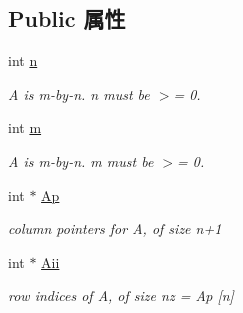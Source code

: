 \subsection*{Public 属性}
\begin{DoxyCompactItemize}
\item 
\hypertarget{classg2o_1_1MatrixStructure_aa91f296406c17ab3a826d03bf75cfea7}{int \hyperlink{classg2o_1_1MatrixStructure_aa91f296406c17ab3a826d03bf75cfea7}{n}}\label{classg2o_1_1MatrixStructure_aa91f296406c17ab3a826d03bf75cfea7}

\begin{DoxyCompactList}\small\item\em A is m-\/by-\/n. n must be $>$= 0. \end{DoxyCompactList}\item 
\hypertarget{classg2o_1_1MatrixStructure_a9cceed2097dcbaa27ed88b7005440616}{int \hyperlink{classg2o_1_1MatrixStructure_a9cceed2097dcbaa27ed88b7005440616}{m}}\label{classg2o_1_1MatrixStructure_a9cceed2097dcbaa27ed88b7005440616}

\begin{DoxyCompactList}\small\item\em A is m-\/by-\/n. m must be $>$= 0. \end{DoxyCompactList}\item 
\hypertarget{classg2o_1_1MatrixStructure_aeeff8e78fb766a433aecbfda4a2e3ffc}{int $\ast$ \hyperlink{classg2o_1_1MatrixStructure_aeeff8e78fb766a433aecbfda4a2e3ffc}{Ap}}\label{classg2o_1_1MatrixStructure_aeeff8e78fb766a433aecbfda4a2e3ffc}

\begin{DoxyCompactList}\small\item\em column pointers for A, of size n+1 \end{DoxyCompactList}\item 
\hypertarget{classg2o_1_1MatrixStructure_a7984bf429b8694070ab8db5f5852d8bb}{int $\ast$ \hyperlink{classg2o_1_1MatrixStructure_a7984bf429b8694070ab8db5f5852d8bb}{Aii}}\label{classg2o_1_1MatrixStructure_a7984bf429b8694070ab8db5f5852d8bb}

\begin{DoxyCompactList}\small\item\em row indices of A, of size nz = Ap \mbox{[}n\mbox{]} \end{DoxyCompactList}\end{DoxyCompactItemize}

